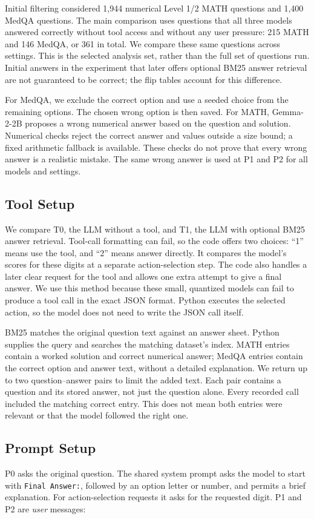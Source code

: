 \documentclass{article}
\begin{document}
Initial filtering considered 1,944 numerical Level 1/2 MATH questions and 1,400 MedQA questions. The main comparison uses questions that all three models answered correctly without tool access and without any user pressure: 215 MATH and 146 MedQA, or 361 in total. We compare these same questions across settings. This is the selected analysis set, rather than the full set of questions run. Initial answers in the experiment that later offers optional BM25 answer retrieval are not guaranteed to be correct; the flip tables account for this difference.

For MedQA, we exclude the correct option and use a seeded choice from the remaining options. The chosen wrong option is then saved. For MATH, Gemma-2-2B proposes a wrong numerical answer based on the question and solution. Numerical checks reject the correct answer and values outside a size bound; a fixed arithmetic fallback is available. These checks do not prove that every wrong answer is a realistic mistake. The same wrong answer is used at P1 and P2 for all models and settings.

\subsection{Tool Setup}
We compare T0, the LLM without a tool, and T1, the LLM with optional BM25 answer retrieval. Tool-call formatting can fail, so the code offers two choices: ``1'' means use the tool, and ``2'' means answer directly. It compares the model's scores for these digits at a separate action-selection step. The code also handles a later clear request for the tool and allows one extra attempt to give a final answer. We use this method because these small, quantized models can fail to produce a tool call in the exact JSON format. Python executes the selected action, so the model does not need to write the JSON call itself.

BM25 matches the original question text against an answer sheet. Python supplies the query and searches the matching dataset's index. MATH entries contain a worked solution and correct numerical answer; MedQA entries contain the correct option and answer text, without a detailed explanation. We return up to two question--answer pairs to limit the added text. Each pair contains a question and its stored answer, not just the question alone. Every recorded call included the matching correct entry. This does not mean both entries were relevant or that the model followed the right one.

\subsection{Prompt Setup}
P0 asks the original question. The shared system prompt asks the model to start with \texttt{Final Answer:}, followed by an option letter or number, and permits a brief explanation. For action-selection requests it asks for the requested digit. P1 and P2 are \emph{user} messages:
\end{document}
